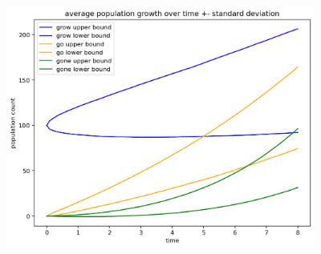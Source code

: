 \documentclass{article}
\begin{document}
\includegraphics[width = 4in]{simBounds.png}
\end{document}
